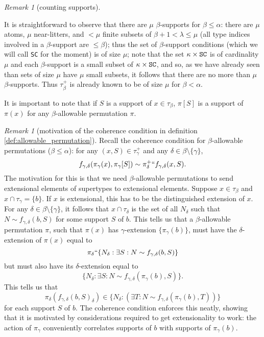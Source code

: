 \documentclass{article}
\theoremstyle{definition}
\theoremstyle{remark}
\newtheorem{remark}[theorem]{Remark}
\newcommand{\rk}[1]{{\color{blue}\sl #1}}
\newcommand{\rk}[1]{}
\begin{document}
\begin{remark}[counting supports]\label{rk:counting_supports}

It is straightforward to observe that there are $\mu$ $\beta$-supports for $\beta\leq \alpha$:  there are $\mu$ atoms, $\mu$ near-litters, and
$<\mu$ finite subsets of $\beta +1<\lambda \leq \mu$ (all type indices involved in a $\beta$-support are $\leq \beta$);  thus the set of $\beta$-support conditions (which we will call {\tt SC} for the moment) is of size $\mu$;
note that the set $\kappa \times {\tt SC}$ is of cardinality $\mu$ and each $\beta$-support is a small subset of  $\kappa \times {\tt SC}$, and so, as we have already seen than sets of size $\mu$ have $\mu$ small subsets, it follows that there are no more than $\mu$ $\beta$-supports.
Thus $\tau_\beta^+$ is already known to be of size $\mu$ for $\beta< \alpha$.

\end{remark}


It is important to note that if $S$ is a support of $x\in \tau_\beta$, $\pi[S]$ is a support of $\pi(x)$ for any $\beta$-allowable permutation $\pi$.

\begin{remark}[motivation of the coherence condition in definition \ref{def:allowable_permutation}]\label{rk:motivate_coherence_condition}
{Recall the coherence condition for $\beta$-allowable permutations ($\beta \leq\alpha$): for any $(x, S) \in \tau_\gamma^+$ and any $\delta \in \beta \setminus \{\gamma\}$,
$$f_{\gamma,\delta}(\pi_\gamma(x),\pi_{\gamma}[S]) \sim \pi_\delta^+``f_{\gamma,\delta}(x,S).$$}%
The motivation for this is that we need $\beta$-allowable permutations to send extensional elements of supertypes to extensional elements.  Suppose $x \in \tau_\beta$ and
$x \cap \tau_\gamma = \{b\}$.  If $x$ is extensional, this has to be the distinguished extension of $x$.  For any $\delta \in \beta \setminus \{\gamma\}$,
it follows that $x \cap \tau_\delta$ is the set of all $N_\delta$ such that $N \sim f_{\gamma,\delta}(b,S)$ for some support $S$ of $b$.  This tells us that a $\beta$-allowable permutation $\pi$, such that $\pi(x)$ has $\gamma$-extension $\{\pi_\gamma(b)\}$, must have the  $\delta$-extension of $\pi(x)$ equal to $$\pi_\delta``\{N_\delta:\exists S:N \sim f_{\gamma,\delta}(b,S)\}$$
but must also have its $\delta$-extension equal to $$\{N_\delta:\exists S:N \sim f_{\gamma,\delta}(\pi_\gamma(b),S)\}.$$  This tells us that $$\pi_\delta(f_{\gamma,\delta}(b,S)_\delta) \in \{N_\delta:(\exists T:N \sim f_{\gamma,\delta}(\pi_\gamma(b),T))\}$$ for each support $S$ of $b$.  The coherence condition enforces this neatly, showing that it is motivated by considerations required to get extensionality to work: the action of $\pi_\gamma$ conveniently correlates supports of $b$ with supports of $\pi_\gamma(b)$.

\end{remark}
\end{document}
